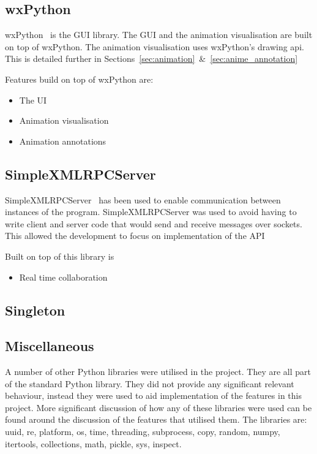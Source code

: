 \subsection{wxPython}

wxPython~\cite{wxpython} is the \ac{GUI} library.  The \ac{GUI} and the animation visualisation are built on top of wxPython.  The animation visualisation uses wxPython's drawing api.  This is detailed further in Sections~\ref{sec:animation}~\&~\ref{sec:anime_annotation}

Features build on top of wxPython are:
\begin{itemize}
\item The \ac{UI}
\item Animation visualisation
\item Animation annotations
\end{itemize}

\subsection{SimpleXMLRPCServer}

SimpleXMLRPCServer~\cite{xmlrpcserver} has been used to enable communication between instances of the program.  SimpleXMLRPCServer was used to avoid having to write client and server code that would send and receive messages over sockets.  This allowed the development to focus on implementation of the \ac{API}

Built on top of this library is
\begin{itemize}
\item Real time collaboration
\end{itemize}

\subsection{Singleton}

\subsection{Miscellaneous}
A number of other Python libraries were utilised in the project.  They are all part of the standard Python library.  They did not provide any significant relevant behaviour, instead they were used to aid implementation of the features in this project.  More significant discussion of how any of these libraries were used can be found around the discussion of the features that utilised them.  The libraries are: uuid, re, platform, os, time, threading, subprocess, copy, random, numpy, itertools, collections, math, pickle, sys, inspect.

